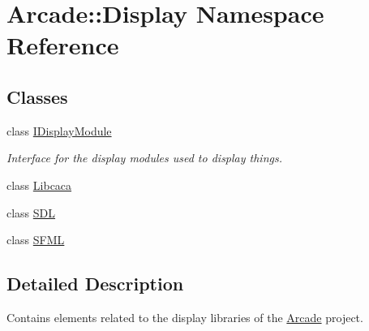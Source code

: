 \hypertarget{namespaceArcade_1_1Display}{}\section{Arcade\+::Display Namespace Reference}
\label{namespaceArcade_1_1Display}
\subsection*{Classes}
\begin{DoxyCompactItemize}
\item 
class \mbox{\hyperlink{classArcade_1_1Display_1_1IDisplayModule}{I\+Display\+Module}}
\begin{DoxyCompactList}\small\item\em Interface for the display modules used to display things. \end{DoxyCompactList}\item 
class \mbox{\hyperlink{classArcade_1_1Display_1_1Libcaca}{Libcaca}}
\item 
class \mbox{\hyperlink{classArcade_1_1Display_1_1SDL}{S\+DL}}
\item 
class \mbox{\hyperlink{classArcade_1_1Display_1_1SFML}{S\+F\+ML}}
\end{DoxyCompactItemize}


\subsection{Detailed Description}
Contains elements related to the display libraries of the \mbox{\hyperlink{namespaceArcade}{Arcade}} project. 